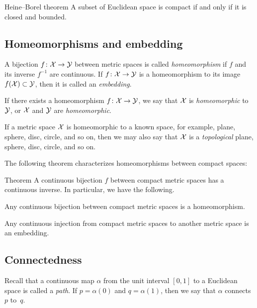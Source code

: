 \begin{thm}{Heine--Borel theorem}\label{thm:Heine--Borel}
A subset of Euclidean space is compact if and only if it is closed and bounded.
\end{thm}


\subsection*{Homeomorphisms and embedding}

A bijection $f\colon\mathcal{X}\to\mathcal{Y}$ between metric spaces is called \emph{homeomorphism} if $f$ and its inverse $f^{-1}$ are continuous.
If $f\colon\mathcal{X}\to\mathcal{Y}$ is a homeomorphism to its image $f(\mathcal{X})\subset \mathcal{Y}$, then it is called an \emph{embedding}.

If there exists a homeomorphism $f\colon\mathcal{X}\to \mathcal{Y}$,
we say that ${\mathcal{X}}$ is {}\emph{homeomorphic} to $\mathcal{Y}$,
or $\mathcal{X}$ and $\mathcal{Y}$ are {}\emph{homeomorphic}.

If a metric space $\mathcal{X}$ is homeomorphic to a known space, for example, plane, sphere, disc, circle, and so on,
then we may also say that $\mathcal{X}$ is a \emph{topological} plane, sphere, disc, circle, and so on.

The following theorem characterizes homeomorphisms between compact spaces:

\begin{thm}{Theorem}\label{thm:Hausdorff-compact}
A continuous bijection $f$ between compact metric spaces has a continuous inverse.
In particular, we have the following.

\begin{subthm}{}
Any continuous bijection between compact metric spaces
is a homeomorphism.
\end{subthm}

\begin{subthm}{}
Any continuous injection from compact metric spaces to another metric space
is an embedding.
\end{subthm}


\end{thm}

\subsection*{Connectedness}

Recall that a continuous map $\alpha$ from the unit interval $[0,1]$ to a Euclidean space is called a \emph{path}.
If $p=\alpha (0)$ and $q = \alpha (1)$, then we say that $\alpha$ connects $p$ to~$q$.


